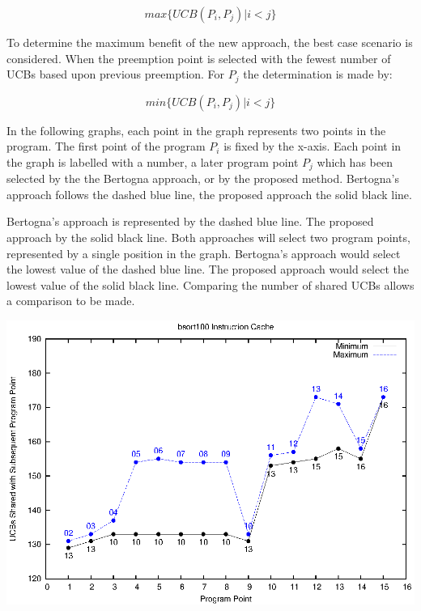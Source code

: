 \begin{equation*}
  max\{ UCB(P_i, P_j) \vert i < j \}
\end{equation*}

To determine the maximum benefit of the new approach, the best case
scenario is considered. When the preemption point is selected with the
fewest number of UCBs based upon previous preemption.  For ${P_j}$ the
determination is made by:

\begin{equation*}
  min\{ UCB(P_i, P_j) \vert i < j \}
\end{equation*}


In the following graphs, each point in the graph represents two points
in the program. The first point of the program ${P_i}$ is fixed by the
x-axis. Each point in the graph is labelled with a number, a later
program point ${P_j}$ which has been selected by the the Bertogna
approach, or by the proposed method. Bertogna's approach follows the
dashed blue line, the proposed approach the solid black line.

Bertogna's approach is represented by the dashed blue line. The proposed
approach by the solid black line. Both approaches will select two
program points, represented by a single position in the
graph. Bertogna's approach would select the lowest value of the dashed
blue line. The proposed approach would select the lowest value of the
solid black line. Comparing the number of shared UCBs allows a
comparison to be made.

\begin{center}
  \includegraphics[width=\linewidth]{eps/bsort-icache.eps}
\end{center}


